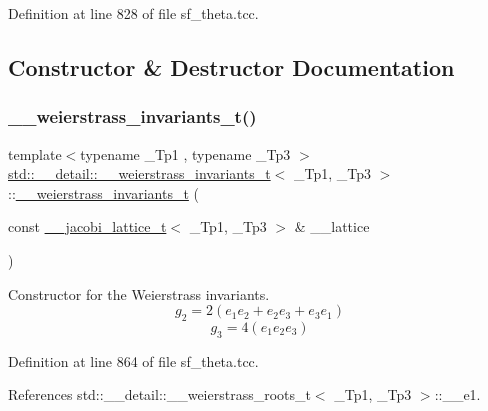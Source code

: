 Definition at line 828 of file sf\+\_\+theta.\+tcc.



\subsection{Constructor \& Destructor Documentation}
\mbox{\label{structstd_1_1____detail_1_1____weierstrass__invariants__t_aeef3f4f3bbb7a950efea23f7c9168091}} 
\subsubsection{\texorpdfstring{\+\_\+\+\_\+weierstrass\+\_\+invariants\+\_\+t()}{\_\_weierstrass\_invariants\_t()}}
{\footnotesize\ttfamily template$<$typename \+\_\+\+Tp1 , typename \+\_\+\+Tp3 $>$ \\
\hyperlink{structstd_1_1____detail_1_1____weierstrass__invariants__t}{std\+::\+\_\+\+\_\+detail\+::\+\_\+\+\_\+weierstrass\+\_\+invariants\+\_\+t}$<$ \+\_\+\+Tp1, \+\_\+\+Tp3 $>$\+::\hyperlink{structstd_1_1____detail_1_1____weierstrass__invariants__t}{\+\_\+\+\_\+weierstrass\+\_\+invariants\+\_\+t} (\begin{DoxyParamCaption}\item[{const \hyperlink{structstd_1_1____detail_1_1____jacobi__lattice__t}{\+\_\+\+\_\+jacobi\+\_\+lattice\+\_\+t}$<$ \+\_\+\+Tp1, \+\_\+\+Tp3 $>$ \&}]{\+\_\+\+\_\+lattice }\end{DoxyParamCaption})}

Constructor for the Weierstrass invariants. \[ g_2 = 2(e_1 e_2 + e_2 e_3 + e_3 e_1) \] \[ g_3 = 4(e_1 e_2 e_3) \] 

Definition at line 864 of file sf\+\_\+theta.\+tcc.



References std\+::\+\_\+\+\_\+detail\+::\+\_\+\+\_\+weierstrass\+\_\+roots\+\_\+t$<$ \+\_\+\+Tp1, \+\_\+\+Tp3 $>$\+::\+\_\+\+\_\+e1.



